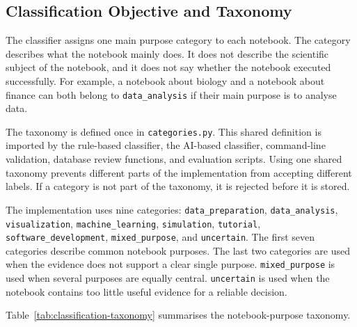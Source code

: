 \subsection{Classification Objective and Taxonomy}
\label{sec:classification-taxonomy}

The classifier assigns one main purpose category to each notebook. The category describes what the notebook mainly does. It does not describe the scientific subject of the notebook, and it does not say whether the notebook executed successfully. For example, a notebook about biology and a notebook about finance can both belong to \texttt{data\_analysis} if their main purpose is to analyse data.

The taxonomy is defined once in \texttt{categories.py}. This shared definition is imported by the rule-based classifier, the AI-based classifier, command-line validation, database review functions, and evaluation scripts. Using one shared taxonomy prevents different parts of the implementation from accepting different labels. If a category is not part of the taxonomy, it is rejected before it is stored.

The implementation uses nine categories: \texttt{data\_preparation}, \texttt{data\_analysis}, \texttt{visualization}, \texttt{machine\_learning}, \texttt{simulation}, \texttt{tutorial}, \texttt{software\_development}, \texttt{mixed\_purpose}, and \texttt{uncertain}. The first seven categories describe common notebook purposes. The last two categories are used when the evidence does not support a clear single purpose. \texttt{mixed\_purpose} is used when several purposes are equally central. \texttt{uncertain} is used when the notebook contains too little useful evidence for a reliable decision.

Table~\ref{tab:classification-taxonomy} summarises the notebook-purpose taxonomy.


